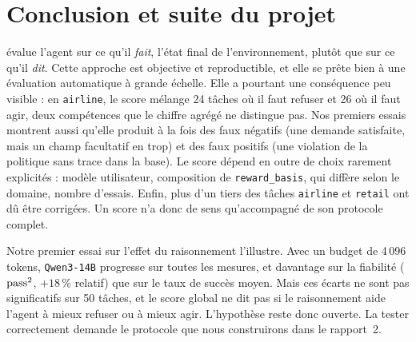 \section{Conclusion et suite du projet}
\label{sec:conclusion}

\taub{} évalue l'agent sur ce qu'il \emph{fait}, l'état final de l'environnement, plutôt que sur ce qu'il \emph{dit}. Cette approche est objective et reproductible, et elle se prête bien à une évaluation automatique à grande échelle. Elle a pourtant une conséquence peu visible : en \texttt{airline}, le score mélange 24 tâches où il faut refuser et 26 où il faut agir, deux compétences que le chiffre agrégé ne distingue pas. Nos premiers essais montrent aussi qu'elle produit à la fois des faux négatifs (une demande satisfaite, mais un champ facultatif en trop) et des faux positifs (une violation de la politique sans trace dans la base). Le score dépend en outre de choix rarement explicités : modèle utilisateur, composition de \texttt{reward\_basis}, qui diffère selon le domaine, nombre d'essais. Enfin, plus d'un tiers des tâches \texttt{airline} et \texttt{retail} ont dû être corrigées. Un score \taub{} n'a donc de sens qu'accompagné de son protocole complet.

Notre premier essai sur l'effet du raisonnement l'illustre. Avec un budget de 4\,096 tokens, \texttt{Qwen3-14B} progresse sur toutes les mesures, et davantage sur la fiabilité ($\text{pass}^{2}$, $+18$\,\% relatif) que sur le taux de succès moyen. Mais ces écarts ne sont pas significatifs sur 50 tâches, et le score global ne dit pas si le raisonnement aide l'agent à mieux refuser ou à mieux agir. L'hypothèse reste donc ouverte. La tester correctement demande le protocole que nous construirons dans le rapport~2.

